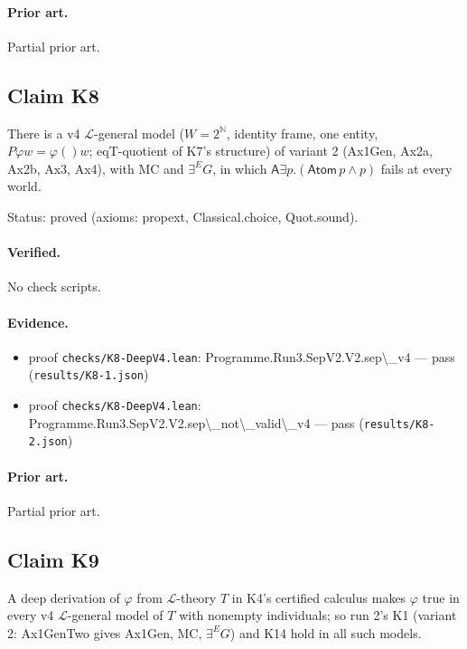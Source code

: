 \documentclass{article}
\begin{document}
\paragraph{Prior art.} Partial prior art.

\subsection*{Claim K8}

There is a v4 $\mathcal L$-general model ($W=2^{\mathbb N}$, identity frame, one entity, $P\varphi w=\varphi()w$; eqT-quotient of K7's structure) of variant 2 (Ax1Gen, Ax2a, Ax2b, Ax3, Ax4), with MC and $\exists^E G$, in which $\mathsf A\exists p.(\mathsf{Atom}\,p\wedge p)$ fails at every world.

Status: proved (axioms: propext, Classical.choice, Quot.sound).

\paragraph{Verified.}
No check scripts.

\paragraph{Evidence.}
\begin{itemize}
\item proof \texttt{checks/K8-DeepV4.lean}: Programme.Run3.SepV2.V2.sep\textbackslash{}\_v4 --- pass (\texttt{results/K8-1.json})
\item proof \texttt{checks/K8-DeepV4.lean}: Programme.Run3.SepV2.V2.sep\textbackslash{}\_not\textbackslash{}\_valid\textbackslash{}\_v4 --- pass (\texttt{results/K8-2.json})
\end{itemize}

\paragraph{Prior art.} Partial prior art.

\subsection*{Claim K9}

A deep derivation of $\varphi$ from $\mathcal L$-theory $T$ in K4's certified calculus makes $\varphi$ true in every v4 $\mathcal L$-general model of $T$ with nonempty individuals; so run 2's K1 (variant 2: Ax1GenTwo gives Ax1Gen, MC, $\exists^E G$) and K14 hold in all such models.
\end{document}
